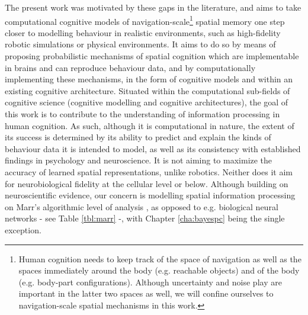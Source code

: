 The present work was motivated by these gaps in the literature, and aims to take computational cognitive models of navigation-scale\footnote{Human cognition needs to keep track of the space of navigation as well as the spaces immediately around the body (e.g. reachable objects) and of the body (e.g. body-part configurations). Although uncertainty and noise play are important in the latter two spaces as well, we will confine ourselves to navigation-scale spatial mechanisms in this work.} spatial memory one step closer to modelling behaviour in realistic environments, such as high-fidelity robotic simulations or physical environments. It aims to do so by means of proposing probabilistic mechanisms of spatial cognition which are implementable in brains and can reproduce behaviour data, and by computationally implementing these mechanisms, in the form of cognitive models and within an existing cognitive architecture. Situated within the computational sub-fields of cognitive science (cognitive modelling and cognitive architectures), the goal of this work is to contribute to the understanding of information processing in human cognition. As such, although it is computational in nature, the extent of its success is determined by its ability to predict and explain the kinds of behaviour data it is intended to model, as well as its consistency with established findings in psychology and neuroscience. It is not aiming to maximize the accuracy of learned spatial representations, unlike robotics. Neither does it aim for neurobiological fidelity at the cellular level or below. Although building on neuroscientific evidence, our concern is modelling spatial information processing on Marr's algorithmic level of analysis \citep{marr1976understanding, marr1977understanding}, as opposed to e.g. biological neural networks - see Table \ref{tbl:marr} -, with Chapter \ref{cha:bayespc} being the single exception. 

